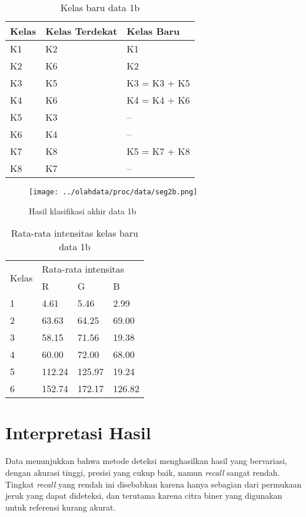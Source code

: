 \documentclass[laporan.tex]{subfiles}
\begin{document}
\begin{table}[h!]
\centering
\begin{tabular}{|l|l|l|}
\hline
Kelas & Kelas Terdekat & Kelas Baru \\
\hline
K1 & K2 & K1 \\
K2 & K6 & K2 \\
K3 & K5 & K3 = K3 + K5 \\
K4 & K6 & K4 = K4 + K6 \\
K5 & K3 & -- \\
K6 & K4 & -- \\
K7 & K8 & K5 = K7 + K8 \\
K8 & K7 & -- \\
\hline
\end{tabular}
\caption{Kelas baru data 1b}
\label{table:clslow2}
\end{table}


\begin{figure}[h!]
\centering
\texttt{[image: ../olahdata/proc/data/seg2b.png]}
\caption{Hasil klasifikasi akhir data 1b}
\end{figure}

\begin{table}[h!]
\centering
\begin{tabular}{|l|l|l|l|}
\cline{1-4}
\multirow{2}{*}{Kelas} & \multicolumn{3}{l|}{Rata-rata intensitas} \\
\cline{2-4}
 & R & G & B \\
\cline{1-4}
1 & 4.61 & 5.46 & 2.99 \\
2 & 63.63 & 64.25 & 69.00 \\
3 & 58.15 & 71.56 & 19.38 \\
4 & 60.00 & 72.00 & 68.00 \\
5 & 112.24 & 125.97 & 19.24 \\
6 & 152.74 & 172.17 & 126.82 \\
\cline{1-4}
\end{tabular}
\caption{Rata-rata intensitas kelas baru data 1b}
\label{table:avglow}
\end{table}

\section{Interpretasi Hasil}

Data menunjukkan bahwa metode deteksi menghasilkan hasil yang bervariasi, dengan akurasi tinggi, presisi yang cukup baik, namun \emph{recall} sangat rendah. Tingkat \emph{recall} yang rendah ini disebabkan karena hanya sebagian dari permukaan jeruk yang dapat dideteksi, dan terutama karena citra biner yang digunakan untuk referensi kurang akurat.
\end{document}
